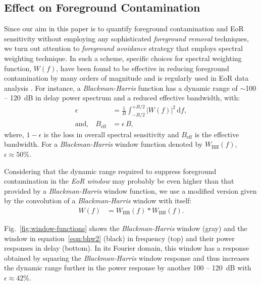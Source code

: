 \documentclass[preprint2,iop,numberedappendix,twocolappendix,appendixfloats]{emulateapj}
\newcommand{\dif}{\mathrm{d}}
\begin{document}
\subsection{Effect on Foreground Contamination}\label{sec:effects-fgdps}

Since our aim in this paper is to quantify foreground contamination and EoR sensitivity without employing any sophisticated {\it foreground removal} techniques, we turn out attention to {\it foreground avoidance} strategy that employs spectral weighting technique. In such a scheme, specific choices for spectral weighting function, $W(f)$, have been found to be effective in reducing foreground contamination by many orders of magnitude \citep{thy13} and is regularly used in EoR data analysis \citep{par12a}. For instance, a {\it Blackman-Harris} function \citep{har78} has a dynamic range of $\sim$100 -- 120~dB in delay power spectrum and a reduced effective bandwidth, with:
\begin{align}\label{eqn:Beff}
  \epsilon &= \frac{1}{B} \int_{-B/2}^{+B/2} |W(f)|^2\,\dif f, \\
  \textrm{and,}\quad B_\textrm{eff} &= \epsilon\,B,
\end{align}
where, $1-\epsilon$ is the loss in overall spectral sensitivity and $B_\textrm{eff}$ is the effective bandwidth. For a {\it Blackman-Harris} window function denoted by $W_\textrm{BH}(f)$, $\epsilon \approx 50\%$. %

Considering that the dynamic range required to suppress foreground contamination in the {\it EoR window} may probably be even higher than that provided by a {\it Blackman-Harris} window function, we use a modified version given by the convolution of a {\it Blackman-Harris} window with itself:
\begin{align}\label{eqn:bhw2}
  W(f) &= W_\textrm{BH}(f) \ast W_\textrm{BH}(f).
\end{align}

Fig.~\ref{fig:window-functions} shows the {\it Blackman-Harris} window (gray) and  the window in equation~\ref{eqn:bhw2} (black) in frequency (top) and their power responses in delay (bottom). In its Fourier domain, this window has a response obtained by squaring the {\it Blackman-Harris} window response and thus increases the dynamic range further in the power response by another 100 -- 120~dB with $\epsilon\approx 42\%$.
\end{document}
